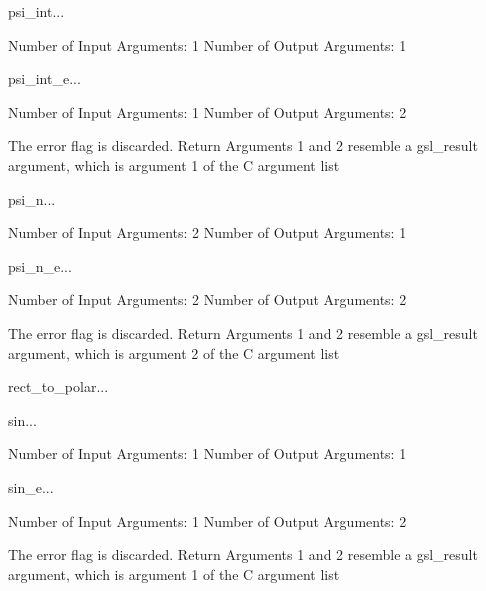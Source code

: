 \begin{funcdesc}{psi_int}{...}

    Number of Input  Arguments:  1
    Number of Output Arguments:  1
\end{funcdesc}

\begin{funcdesc}{psi_int_e}{...}

    Number of Input  Arguments:  1
    Number of Output Arguments:  2

The error flag is discarded.
Return Arguments 1 and 2 resemble a gsl_result argument,
	which is  argument 1 of the C argument list

\end{funcdesc}

\begin{funcdesc}{psi_n}{...}

    Number of Input  Arguments:  2
    Number of Output Arguments:  1
\end{funcdesc}

\begin{funcdesc}{psi_n_e}{...}

    Number of Input  Arguments:  2
    Number of Output Arguments:  2

The error flag is discarded.
Return Arguments 1 and 2 resemble a gsl_result argument,
	which is  argument 2 of the C argument list

\end{funcdesc}

\begin{funcdesc}{rect_to_polar}{...}

\end{funcdesc}

\begin{funcdesc}{sin}{...}

    Number of Input  Arguments:  1
    Number of Output Arguments:  1
\end{funcdesc}

\begin{funcdesc}{sin_e}{...}

    Number of Input  Arguments:  1
    Number of Output Arguments:  2

The error flag is discarded.
Return Arguments 1 and 2 resemble a gsl_result argument,
	which is  argument 1 of the C argument list

\end{funcdesc}


